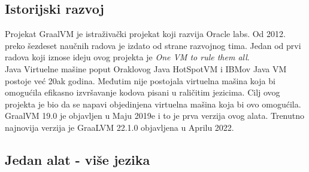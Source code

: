 \documentclass[a4paper]{article}
\begin{document}
\subsection{Istorijski razvoj}
\label{subsec:Istorijski razvoj}

Projekat GraalVM je istraživački projekat koji razvija Oracle labs. Od 2012. preko šezdeset naučnih radova je izdato od strane razvojnog tima. Jedan od prvi radova koji iznose ideju ovog projekta je \textit{One VM to rule them all}. \cite{onevmtorulethemall} \\

Java Virtuelne mašine poput Oraklovog Java HotSpotVM i IBMov Java VM postoje već 20ak godina. Međutim nije postojala virtuelna mašina koja bi omogućila efikasno izvršavanje kodova pisani u raličitim jezicima. Cilj ovog projekta je bio da se napavi objedinjena virtuelna mašina koja bi ovo omogućila.\\

GraalVM 19.0 je objavljen u Maju 2019e i to je prva verzija ovog alata. Trenutno najnovija verzija je GraaLVM 22.1.0 objavljena u Aprilu 2022. \cite{graalvmreleases}



\subsection{Jedan alat - više jezika}
\end{document}

